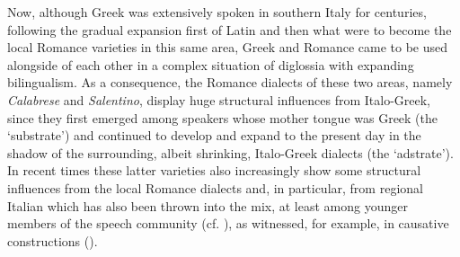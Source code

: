 \documentclass[output=paper,modfonts,nonflat]{langsci/langscibook}
\begin{document}
Now, although Greek was extensively spoken in southern Italy for centuries, following the gradual expansion first of Latin and then what were to become the local Romance varieties in this same area, Greek and Romance came to be used alongside of each other in a complex situation of diglossia with expanding bilingualism. As a consequence, the Romance dialects of these two areas, namely \textit{Calabrese} and \textit{Salentino}, display huge structural influences from Italo-Greek, since they first emerged among speakers whose mother tongue was Greek (the `substrate') and continued to develop and expand to the present day in the shadow of the surrounding, albeit shrinking, Italo-Greek dialects (the `adstrate'). In recent times these latter varieties also increasingly show some structural influences from the local Romance dialects and, in particular, from regional Italian which has also been thrown into the mix, at least among younger members of the speech community (cf. \citealt[338]{Martino1980,Profili1985,Marra2008,Romano2008}), as witnessed, for example, in causative constructions (\citealt{LedgewaySchifanoSilvestriInpress, LedgewaySchifanoSilvestriInPrep}).
\end{document}
